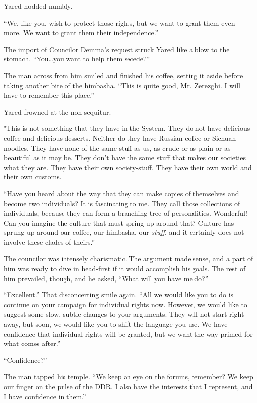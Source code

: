 Yared nodded numbly.

``We, like you, wish to protect those rights, but we want to grant them even more. We want to grant them their independence.''

The import of Councilor Demma's request struck Yared like a blow to the stomach. ``You\ldots you want to help them secede?''

The man across from him smiled and finished his coffee, setting it aside before taking another bite of the himbasha. ``This is quite good, Mr.~Zerezghi. I will have to remember this place.''

Yared frowned at the non sequitur.

"This is not something that they have in the System. They do not have delicious coffee and delicious desserts. Neither do they have Russian coffee or Sichuan noodles. They have none of the same stuff as us, as crude or as plain or as beautiful as it may be. They don't have the same stuff that makes our societies what they are. They have their own society-stuff. They have their own world and their own customs.

``Have you heard about the way that they can make copies of themselves and become two individuals? It is fascinating to me. They call those collections of individuals, because they can form a branching tree of personalities. Wonderful! Can you imagine the culture that must spring up around that? Culture has sprung up around our coffee, our himbasha, our \emph{stuff}, and it certainly does not involve these clades of theirs.''

The councilor was intensely charismatic. The argument made sense, and a part of him was ready to dive in head-first if it would accomplish his goals. The rest of him prevailed, though, and he asked, ``What will you have me do?''

``Excellent.'' That disconcerting smile again. ``All we would like you to do is continue on your campaign for individual rights now. However, we would like to suggest some slow, subtle changes to your arguments. They will not start right away, but soon, we would like you to shift the language you use. We have confidence that individual rights will be granted, but we want the way primed for what comes after.''

``Confidence?''

The man tapped his temple. ``We keep an eye on the forums, remember? We keep our finger on the pulse of the DDR. I also have the interests that I represent, and I have confidence in them.''

